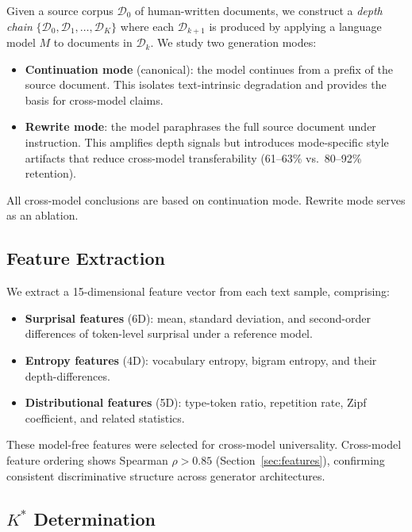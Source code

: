\documentclass[11pt]{article}
\newcommand{\kstar}{K^*}
\begin{document}
Given a source corpus $\mathcal{D}_0$ of human-written documents, we construct a \emph{depth chain} $\{\mathcal{D}_0, \mathcal{D}_1, \ldots, \mathcal{D}_K\}$ where each $\mathcal{D}_{k+1}$ is produced by applying a language model $M$ to documents in $\mathcal{D}_k$.
We study two generation modes:

\begin{itemize}[nosep]
    \item \textbf{Continuation mode} (canonical): the model continues from a prefix of the source document. This isolates text-intrinsic degradation and provides the basis for cross-model claims.
    \item \textbf{Rewrite mode}: the model paraphrases the full source document under instruction. This amplifies depth signals but introduces mode-specific style artifacts that reduce cross-model transferability (61--63\% vs.\ 80--92\% retention).
\end{itemize}

All cross-model conclusions are based on continuation mode. Rewrite mode serves as an ablation.

\subsection{Feature Extraction}

We extract a 15-dimensional feature vector from each text sample, comprising:
\begin{itemize}[nosep]
    \item \textbf{Surprisal features} (6D): mean, standard deviation, and second-order differences of token-level surprisal under a reference model.
    \item \textbf{Entropy features} (4D): vocabulary entropy, bigram entropy, and their depth-differences.
    \item \textbf{Distributional features} (5D): type-token ratio, repetition rate, Zipf coefficient, and related statistics.
\end{itemize}

These model-free features were selected for cross-model universality. Cross-model feature ordering shows Spearman $\rho > 0.85$ (Section~\ref{sec:features}), confirming consistent discriminative structure across generator architectures.

\subsection{$\kstar$ Determination}
\label{sec:kstar-def}
\end{document}
